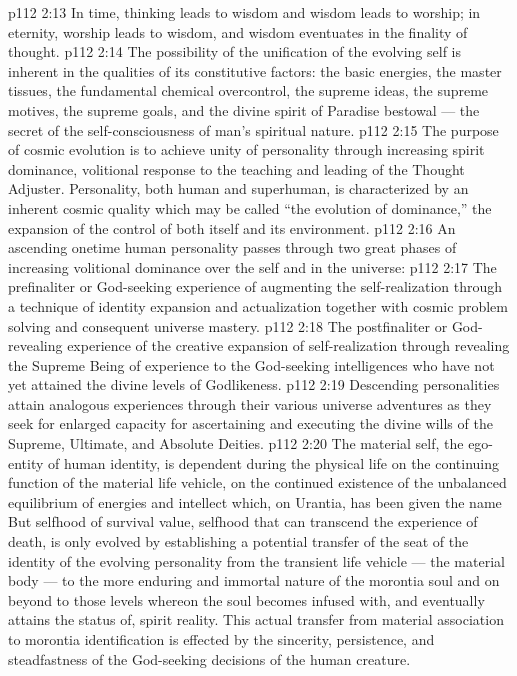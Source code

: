 \vs p112 2:13 In time, thinking leads to wisdom and wisdom leads to worship; in eternity, worship leads to wisdom, and wisdom eventuates in the finality of thought.
\vs p112 2:14 The possibility of the unification of the evolving self is inherent in the qualities of its constitutive factors: the basic energies, the master tissues, the fundamental chemical overcontrol, the supreme ideas, the supreme motives, the supreme goals, and the divine spirit of Paradise bestowal --- the secret of the self\hyp{}consciousness of man’s spiritual nature.
\vs p112 2:15 The purpose of cosmic evolution is to achieve unity of personality through increasing spirit dominance, volitional response to the teaching and leading of the Thought Adjuster. Personality, both human and superhuman, is characterized by an inherent cosmic quality which may be called “the evolution of dominance,” the expansion of the control of both itself and its environment.
\vs p112 2:16 \pc An ascending onetime human personality passes through two great phases of increasing volitional dominance over the self and in the universe:
\vs p112 2:17 \bibnobreakspace The prefinaliter or God\hyp{}seeking experience of augmenting the self\hyp{}realization through a technique of identity expansion and actualization together with cosmic problem solving and consequent universe mastery.
\vs p112 2:18 \bibnobreakspace The postfinaliter or God\hyp{}revealing experience of the creative expansion of self\hyp{}realization through revealing the Supreme Being of experience to the God\hyp{}seeking intelligences who have not yet attained the divine levels of Godlikeness.
\vs p112 2:19 \pc Descending personalities attain analogous experiences through their various universe adventures as they seek for enlarged capacity for ascertaining and executing the divine wills of the Supreme, Ultimate, and Absolute Deities.
\vs p112 2:20 \pc The material self, the ego\hyp{}entity of human identity, is dependent during the physical life on the continuing function of the material life vehicle, on the continued existence of the unbalanced equilibrium of energies and intellect which, on Urantia, has been given the name  But selfhood of survival value, selfhood that can transcend the experience of death, is only evolved by establishing a potential transfer of the seat of the identity of the evolving personality from the transient life vehicle --- the material body --- to the more enduring and immortal nature of the morontia soul and on beyond to those levels whereon the soul becomes infused with, and eventually attains the status of, spirit reality. This actual transfer from material association to morontia identification is effected by the sincerity, persistence, and steadfastness of the God\hyp{}seeking decisions of the human creature.
